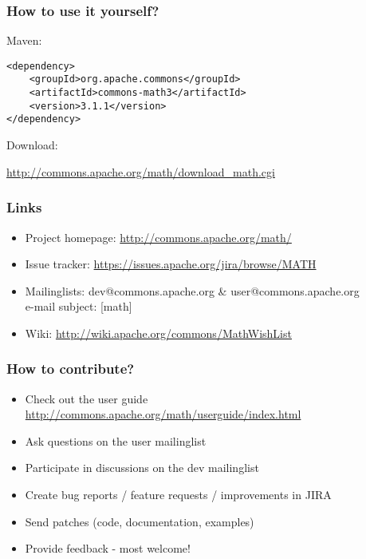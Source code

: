 \documentclass[10pt,mathserif]{beamer}
\begin{document}
\begin{frame}[fragile]
  \frametitle{How to use it yourself?}

Maven:

\begin{verbatim}
<dependency>
	<groupId>org.apache.commons</groupId>
	<artifactId>commons-math3</artifactId>
	<version>3.1.1</version>
</dependency>
\end{verbatim}

Download:

\url{http://commons.apache.org/math/download_math.cgi}
            
\end{frame}

\begin{frame}
  \frametitle{Links}

\begin{itemize}
  \item Project homepage: \url{http://commons.apache.org/math/}
  \item Issue tracker: \url{https://issues.apache.org/jira/browse/MATH}
  \item Mailinglists: dev@commons.apache.org \& user@commons.apache.org \\
  e-mail subject: [math]
  \item Wiki: \url{http://wiki.apache.org/commons/MathWishList}
\end{itemize}

\end{frame}

\begin{frame}
  \frametitle{How to contribute?}

\begin{itemize}
  \item Check out the user guide \url{http://commons.apache.org/math/userguide/index.html}
  \item Ask questions on the user mailinglist
  \item Participate in discussions on the dev mailinglist
  \item Create bug reports / feature requests / improvements in JIRA
  \item Send patches (code, documentation, examples)
  \item Provide feedback - most welcome!
\end{itemize}

\end{frame}
\end{document}
